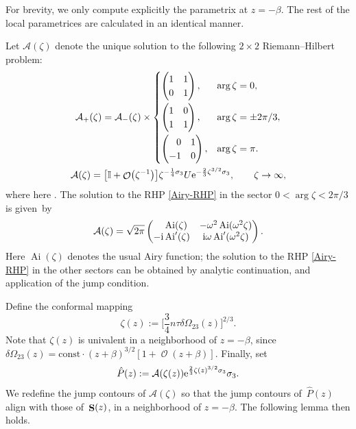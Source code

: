 \documentclass[10pt,a4paper]{amsart}
\DeclareMathOperator{\OO}{\mathcal{O}}
\DeclareMathOperator{\Ai}{Ai}
\DeclareMathOperator{\boldS}{{\bf S}}
\numberwithin{equation}{section}
\begin{document}
For brevity, we only compute explicitly the parametrix at $z=-\beta$. The rest of the local parametrices are calculated in an identical manner.

Let $\mathcal{A}(\zeta)$ denote the unique solution to the following $2\times 2$ Riemann--Hilbert problem:
 \begin{gather}
 \mathcal{A}_+(\zeta) = \mathcal{A}_-(\zeta)\times
 \begin{cases}
 \begin{pmatrix}1 & 1\\ 0 & 1\end{pmatrix}, & \arg \zeta = 0,\vspace{1mm}\\
 \begin{pmatrix}1 & 0\\ 1 & 1\end{pmatrix}, & \arg \zeta = \pm 2\pi/3,\vspace{1mm}\\
 \begin{pmatrix}\hphantom{-}0 & 1\\ -1 & 0\end{pmatrix}, & \arg \zeta = \pi.
 \end{cases}\nonumber\\
 \mathcal{A}(\zeta) = \bigl[\mathbb{I} + \OO\bigl(\zeta^{-1}\bigr)\bigr]\zeta^{-\frac{1}{4}\sigma_3} U {\rm e}^{-\frac{2}{3}\zeta^{3/2}\sigma_3}, \qquad \zeta\to \infty,\label{Airy-RHP}
 \end{gather}
where here . The solution to the RHP \eqref{Airy-RHP} in the sector
$0 < \arg \zeta < 2\pi/3$ is given~by
 \begin{equation*}
 \mathcal{A}(\zeta) = \sqrt{2\pi}
 \begin{pmatrix}
 \hphantom{-}\Ai(\zeta) &-\omega^2 \Ai(\omega^2\zeta)\\
 -{\rm i}\Ai'(\zeta)& {\rm i}\omega \Ai'(\omega^2\zeta)
 \end{pmatrix}.
 \end{equation*}
Here $\Ai(\zeta)$ denotes the usual Airy function; the solution to the RHP \eqref{Airy-RHP} in the other sectors can be obtained by analytic continuation, and
application of the jump condition.

Define the conformal mapping
 \begin{equation*}
 \zeta(z) := \biggl[\frac{3}{4}n\tau \delta\Omega_{23}(z)\biggr]^{2/3}.
 \end{equation*}
Note that $\zeta(z)$ is univalent in a neighborhood of $z=-\beta$, since $\delta\Omega_{23}(z) = \text{const}\cdot (z+\beta)^{3/2}[1+ \OO(z+\beta)]$.
Finally, set
 \begin{equation*}
 \hat{P}(z) := \mathcal{A}(\zeta(z)) {\rm e}^{\frac{2}{3}\zeta(z)^{3/2}\sigma_3}\sigma_3.
 \end{equation*}
We redefine the jump contours of $\mathcal{A}(\zeta)$ so that the jump contours of~$\hat{P}(z)$ align with those of~$\boldS(z)$, in a neighborhood of $z=-\beta$.
The following lemma then holds.
\end{document}
